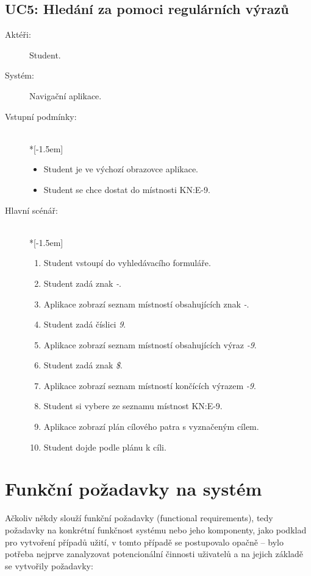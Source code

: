 \subsection{UC5: Hledání za pomoci regulárních výrazů}
\begin{description}
\item[Aktéři:] Student.
\item[Systém:] Navigační aplikace.
\item[Vstupní podmínky:] ~\\*[-1.5em]
 \begin{itemize}
 \item Student je ve výchozí obrazovce aplikace.
 \item Student se chce dostat do místnosti KN:E-9.
 \end{itemize}
\item[Hlavní scénář:] ~\\*[-1.5em]
 \begin{enumerate}
 \item Student vstoupí do vyhledávacího formuláře.
 \item Student zadá znak \emph{-}.
 \item Aplikace zobrazí seznam místností obsahujících znak \emph{-}.
 \item Student zadá číslici \emph{9}.
 \item Aplikace zobrazí seznam místností obsahujících výraz \emph{-9}.
 \item Student zadá znak \emph{\$}.
 \item Aplikace zobrazí seznam místností končících výrazem \emph{-9}.
 \item Student si vybere ze seznamu místnost KN:E-9.
 \item Aplikace zobrazí plán cílového patra s vyznačeným cílem.
 \item Student dojde podle plánu k cíli.
 \end{enumerate}
\end{description}



\section{Funkční požadavky na systém}
Ačkoliv někdy slouží funkční požadavky (functional requirements), tedy požadavky na konkrétní funkčnost systému nebo jeho komponenty, jako podklad pro vytvoření případů užití, v tomto případě se postupovalo opačně -- bylo potřeba nejprve zanalyzovat potencionální činnosti uživatelů a na jejich základě se vytvořily požadavky:
